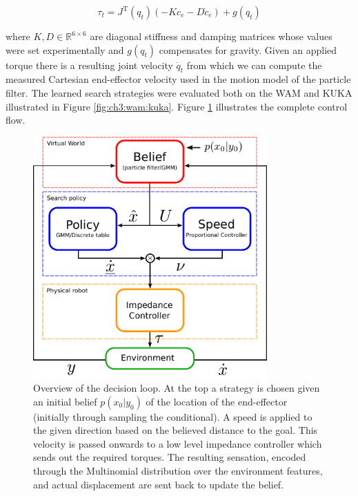 \begin{equation}\label{eq:ch3:torque_control}
 \tau_t = J^{\mathrm{T}}(q_t)\left(-K c_e - D \dot{c}_e \right) + g(q_t)
\end{equation}

where $K,D \in \mathbb{R}^{6\times6}$ are diagonal stiffness and damping matrices whose values were set experimentally 
and $g(q_t)$ compensates for gravity. Given an applied torque there is a resulting joint velocity $\dot{q}_t$ from which we can compute the 
measured Cartesian end-effector velocity used in the motion model of the particle filter. The learned search strategies were evaluated both on 
the WAM and KUKA illustrated in Figure \ref{fig:ch3:wam:kuka}. Figure \ref{fig:ch3:control_flow} illustrates the complete control flow.

\begin{figure}
\centering
  \includegraphics[width=0.8\textwidth]{./ch3-Search/Figures/Control_schematics}
  \caption{Overview of the decision loop. At the top a strategy is chosen given an initial belief
$p(x_{0}|y_{0})$ of the location of the end-effector (initially through sampling the conditional). 
A speed is applied to the given direction based on the believed distance
to the goal. This velocity is passed onwards to
a low level impedance controller which sends out the required torques. The
resulting sensation, encoded through the Multinomial distribution over
  the environment features, and actual displacement are sent back to update the
belief.}
  \label{fig:ch3:control_flow}
\end{figure}
\FloatBarrier
